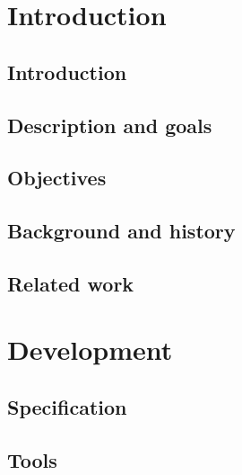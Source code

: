 \documentclass[BSP,english,oneside]{classes/gucthesis}
\begin{document}


\makefrontpages



\tableofcontents
\listoffigures
\listoftables
\newpage
\setcounter{page}{1}
\part{Introduction}
	
	\chapter{Introduction}
		\label{chap:introduction}
		

	\chapter{Description and goals}
		\label{chap:description_goals}
		

	\chapter{Objectives}
		\label{chap:objectives}
		

	\chapter{Background and history}
		\label{chap:background}
		

	\chapter{Related work}
		\label{chap:related_work}
		


\part{Development}

	\chapter{Specification}
		\label{chap:specification}
		

	\chapter{Tools}
		\label{chap:tools}
\end{document}
